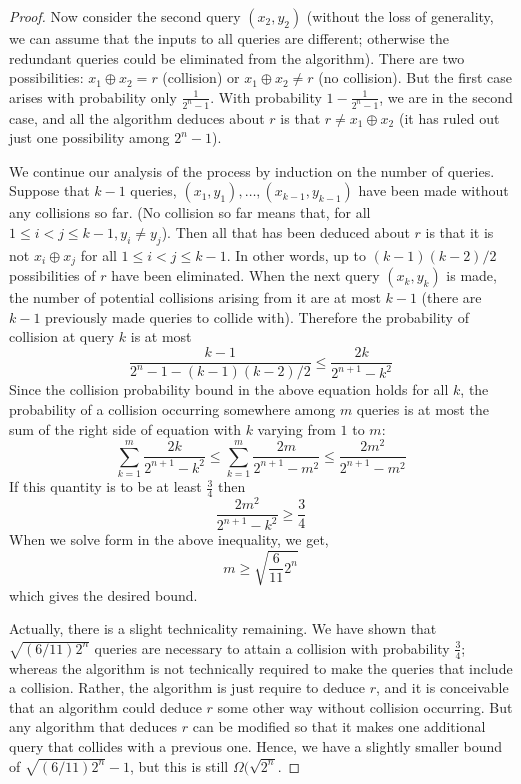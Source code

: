 \documentclass[12pt, oneside]{book}
\theoremstyle{definition}
\theoremstyle{definition}
\theoremstyle{remark}
\begin{document}
\begin{proof}
    Now consider the second query $(x_2,y_2)$ (without the loss of generality, we can assume that the inputs to all queries are different; otherwise the redundant queries could be eliminated from the algorithm). There are two possibilities: $x_1 \oplus x_2 =r$ (collision) or $x_1\oplus x_2 \neq r$ (no collision). But the first case arises with probability only $\frac{1}{2^n-1}$. With probability $1-\frac{1}{2^n-1}$, we are in the second case, and all the algorithm deduces about $r$ is that $r\neq x_1\oplus x_2$ (it has ruled out just one possibility among $2^n-1$).

    We continue our analysis of the process by induction on the number of queries. Suppose that $k-1$ queries, $(x_1,y_1),\ldots,(x_{k-1},y_{k-1})$ have been made without any collisions so far. (No collision so far means that, for all $1\leq i<j\leq k-1, y_i\neq y_j$). Then all that has been deduced about $r$ is that it is not $x_i \oplus x_j$ for all $1\leq i<j\leq k-1$. In other words, up to $(k-1)(k-2)/2$ possibilities of $r$ have been eliminated. When the next query $(x_k,y_k)$ is made, the number of potential collisions arising from it are at most $k-1$ (there are $k-1$ previously made queries to collide with). Therefore the probability of collision at query $k$ is at most
    \[
    \frac{k-1}{2^n-1-(k-1)(k-2)/2} \leq \frac{2k}{2^{n+1}-k^2}
    \]
    Since the collision probability bound in the above equation holds for all $k$, the probability of a collision occurring somewhere among $m$ queries is at most the sum of the right side of equation with $k$ varying from $1$ to $m$:
    \[
    \sum_{k=1}^m \frac{2k}{2^{n+1}-k^2} \leq \sum_{k=1}^m \frac{2m}{2^{n+1}-m^2} \leq \frac{2m^2}{2^{n+1}-m^2}
    \]
    If this quantity is to be at least $\frac{3}{4}$ then
    \[
    \frac{2m^2}{2^{n+1}-k^2} \geq \frac{3}{4}
    \]
    When we solve form in the above inequality, we get,
    \[
    m\geq \sqrt{\frac{6}{11}2^n}
    \]
    which gives the desired bound.

    Actually, there is a slight technicality remaining. We have shown that $\sqrt{(6/11)2^n}$ queries are necessary to attain a collision with probability $\frac{3}{4}$; whereas the algorithm is not technically required to make the queries that include a collision. Rather, the algorithm is just require to deduce $r$, and it is conceivable that an algorithm could deduce $r$ some other way without collision occurring. But any algorithm that deduces $r$ can be modified so that it makes one additional query that collides with a previous one. Hence, we have a slightly smaller bound of $\sqrt{(6/11)2^n}-1$, but this is still $\Omega(\sqrt{2^n}$.
\end{proof}
\end{document}
